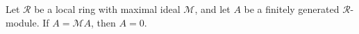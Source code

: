Let $\mathcal{R}$ be a local ring with maximal ideal $\mathcal{M}$, and let $A$ be a finitely generated $\mathcal{R}$-module. If $A = \mathcal{M}A$, then $A = 0$.
